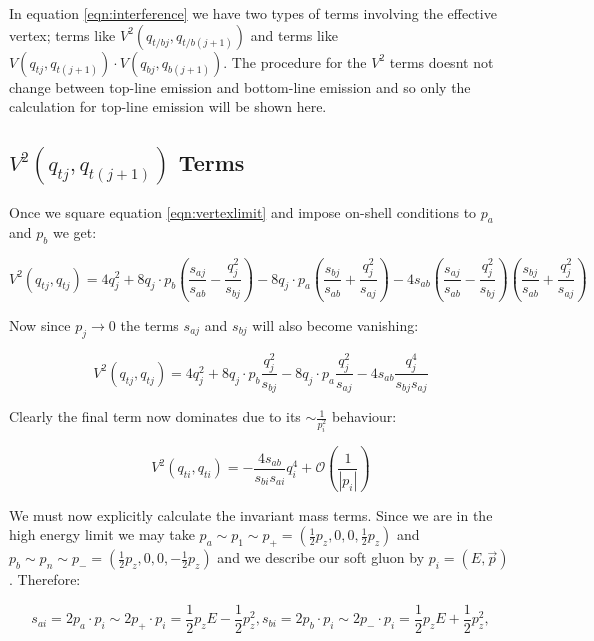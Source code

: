		In equation \ref{eqn:interference} we have two types of terms involving the effective vertex;
		terms like $V^2(q_{t/bj}, q_{t/b(j+1)})$ and terms like $V(q_{tj}, q_{t(j+1)})\cdot V(q_{bj}, q_{b(j+1)})$.
		The procedure for the $V^2$ terms doesnt not change between top-line emission and bottom-line emission
		and so only the calculation for top-line emission will be shown here.

	\subsection{$V^2(q_{tj}, q_{t(j+1)})$ Terms}
	\label{sub:subsection_name}

		Once we square equation \ref{eqn:vertexlimit} and impose on-shell conditions to $p_a$ and $p_b$ we get:

		\begin{equation}
			V^2(q_{tj}, q_{tj}) = 4q_j^2 + 8 q_j\cdot p_b \left(\frac{s_{aj}}{s_{ab}} - \frac{q^2_{j}}{s_{bj}}\right) -
				8q_j\cdot p_a \left(\frac{s_{bj}}{s_{ab}} + \frac{q_j^2}{s_{aj}}\right) - 4s_{ab}\left(\frac{s_{aj}}{s_{ab}} -
				\frac{q^2_{j}}{s_{bj}}\right)\left(\frac{s_{bj}}{s_{ab}} + \frac{q_j^2}{s_{aj}}\right)
		\end{equation}

		Now since $p_j\rightarrow0$ the terms $s_{aj}$ and $s_{bj}$ will also become vanishing:

		\begin{equation}
			V^2(q_{tj}, q_{tj}) = 4q_j^2 + 8 q_j\cdot p_b \frac{q^2_{j}}{s_{bj}} - 8 q_j\cdot p_a \frac{q_j^2}{s_{aj}} -
				4s_{ab}\frac{q^4_{j}}{s_{bj}s_{aj}}
		\end{equation}

		Clearly the final term now dominates due to its $\sim\frac{1}{p_i^2}$ behaviour:

		\begin{equation}
			V^2(q_{ti}, q_{ti}) = - \frac{4s_{ab}}{s_{bi}s_{ai}}q^4_{i} + \mathcal{O}\left(\frac{1}{|p_i|}\right)
			\label{eqn:temp}
		\end{equation}

		We must now explicitly calculate the invariant mass terms.  Since we are in the high energy limit we may take
		$p_a\sim p_1 \sim p_+ = (\frac12 p_z, 0, 0, \frac12 p_z)$ and $p_b\sim p_n \sim p_- = (\frac12 p_z, 0, 0, -\frac12 p_z)$
		and we describe our soft gluon by $p_i=(E, \vec{p})$.  Therefore:

		\begin{subequations}
			\begin{equation}
				s_{ai} = 2p_a\cdot p_i\sim2p_+\cdot p_i = \frac12p_zE - \frac12p_z^2,
			\end{equation}
			\begin{equation}
				s_{bi} = 2p_b\cdot p_i\sim2p_-\cdot p_i = \frac12p_zE + \frac12p_z^2,
			\end{equation}
		\end{subequations}

